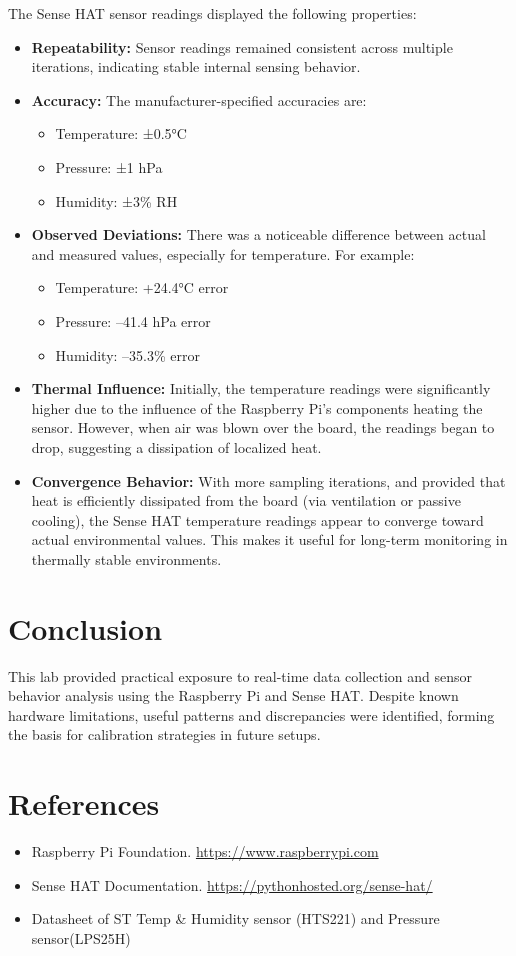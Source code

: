 \documentclass[a4paper,12pt]{article}
\begin{document}
The Sense HAT sensor readings displayed the following properties:

\begin{itemize}
    \item \textbf{Repeatability:} Sensor readings remained consistent across multiple iterations, indicating stable internal sensing behavior.

    \item \textbf{Accuracy:} The manufacturer-specified accuracies are:
    \begin{itemize}
        \item Temperature: ±0.5°C
        \item Pressure: ±1 hPa
        \item Humidity: ±3\% RH
    \end{itemize}

    \item \textbf{Observed Deviations:} There was a noticeable difference between actual and measured values, especially for temperature. For example:
    \begin{itemize}
        \item Temperature: +24.4°C error
        \item Pressure: –41.4 hPa error
        \item Humidity: –35.3\% error
    \end{itemize}

    \item \textbf{Thermal Influence:} Initially, the temperature readings were significantly higher due to the influence of the Raspberry Pi’s components heating the sensor. However, when air was blown over the board, the readings began to drop, suggesting a dissipation of localized heat.

    \item \textbf{Convergence Behavior:} With more sampling iterations, and provided that heat is efficiently dissipated from the board (via ventilation or passive cooling), the Sense HAT temperature readings appear to converge toward actual environmental values. This makes it useful for long-term monitoring in thermally stable environments.
\end{itemize}

\section{Conclusion}
This lab provided practical exposure to real-time data collection and sensor behavior analysis using the Raspberry Pi and Sense HAT. Despite known hardware limitations, useful patterns and discrepancies were identified, forming the basis for calibration strategies in future setups.

\section{References}
\begin{itemize}
    \item Raspberry Pi Foundation. \url{https://www.raspberrypi.com}
    \item Sense HAT Documentation. \url{https://pythonhosted.org/sense-hat/}
    \item Datasheet of ST Temp \& Humidity sensor (HTS221) and Pressure sensor(LPS25H) 
\end{itemize}
\end{document}
